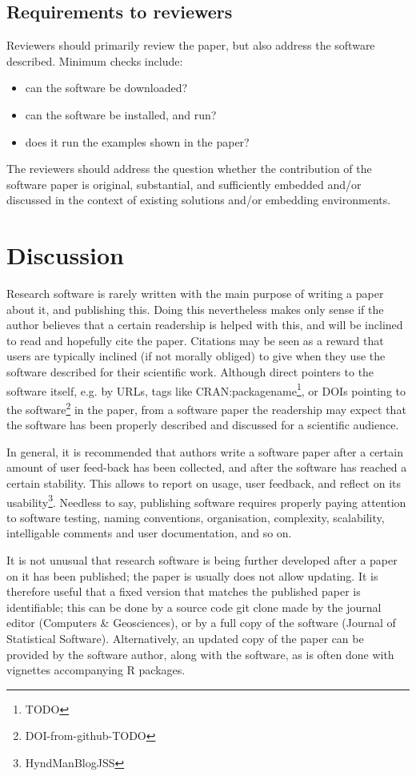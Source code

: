 \documentclass{article}
\begin{document}
\subsection{Requirements to reviewers}
Reviewers should primarily review the paper, but also address the
software described. Minimum checks include:
\begin{itemize}
\item can the software be downloaded?
\item can the software be installed, and run?
\item does it run the examples shown in the paper?
\end{itemize}
The reviewers should address the question whether the contribution
of the software paper is original, substantial, and sufficiently
embedded and/or discussed in the context of existing solutions
and/or embedding environments.

\section{Discussion}
Research software is rarely written with the main purpose of writing
a paper about it, and publishing this. Doing this nevertheless makes
only sense if the author believes that a certain readership is helped
with this, and will be inclined to read and hopefully cite the paper.
Citations may be seen as a reward that users are typically inclined
(if not morally obliged) to give when they use the software described
for their scientific work. Although direct pointers to the software
itself, e.g. by URLs, tags like CRAN:packagename\footnote{TODO},
or DOIs pointing to the software\footnote{DOI-from-github-TODO}
in the paper, from a software paper the readership may expect
that the software has been properly described and discussed for a
scientific audience.

In general, it is recommended that authors write a software paper
after a certain amount of user feed-back has been collected,
and after the software has reached a certain stability. This
allows to report on usage, user feedback, and reflect on
its usability\footnote{HyndManBlogJSS}. Needless to say, publishing
software requires properly paying attention to software testing,
naming conventions, organisation, complexity, scalability,
intelligable comments and user documentation, and so on.

It is not unusual that research software is being further developed
after a paper on it has been published; the paper is usually does
not allow updating. It is therefore useful that a fixed version
that matches the published paper is identifiable; this can be done
by a source code git clone made by the journal editor (Computers
\& Geosciences), or by a full copy of the software (Journal of
Statistical Software). Alternatively, an updated copy of the paper
can be provided by the software author, along with the software, as
is often done with vignettes accompanying R packages\cite{xx}.
\end{document}
